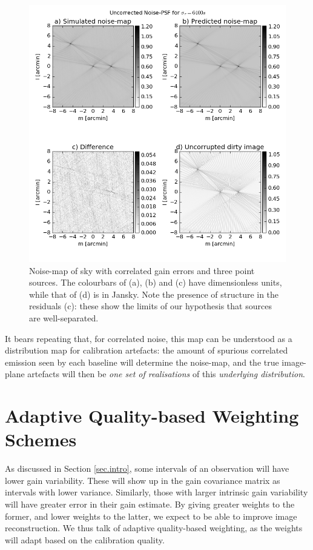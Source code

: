 \begin{figure}[h!]
\centering
\includegraphics[width=\textwidth]{images/Ctime6400-noisePSFandDirty-uncorr.png}
\caption{\label{imag.simu-3sources.noisemap} {Noise-map of sky with correlated gain errors and three point sources. The colourbars of (a), (b) and (c) have dimensionless units, while that of (d) is in Jansky. Note the presence of structure in the residuals (c): these show the limits of our hypothesis that sources are well-separated.}}
\end{figure}

\pg
It bears repeating that, for correlated noise, this map can be understood as a distribution map for calibration artefacts: the amount of spurious correlated emission seen by each baseline will determine the noise-map, and the true image-plane artefacts will then be \emph{one set of realisations} of this \emph{underlying distribution}.

\section{Adaptive Quality-based Weighting Schemes}\label{sec.DynamicRange}

\pg
As discussed in Section \ref{sec.intro}, some intervals of an observation will have lower gain variability. These will show up in the gain covariance matrix as intervals with lower variance. Similarly, those with larger intrinsic gain variability will have greater error in their gain estimate. By giving greater weights to the former, and lower weights to the latter, we expect to be able to improve image reconstruction. {We thus talk of adaptive quality-based weighting, as the weights will adapt based on the calibration quality.}

